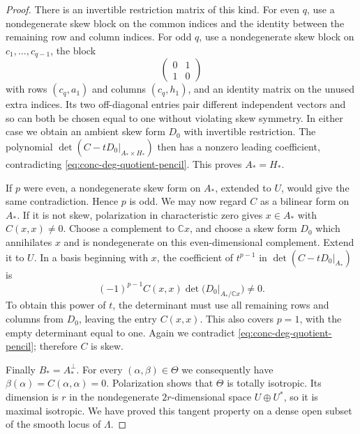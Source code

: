 \begin{proof}
There is an invertible restriction matrix of this kind.  For even $q$, use a nondegenerate skew block on the common indices and the identity between the remaining row and column indices.  For odd $q$, use a nondegenerate skew block on $c_1,\ldots,c_{q-1}$, the block
\[
 \begin{pmatrix}0&1\\1&0\end{pmatrix}
\]
with rows $(c_q,a_1)$ and columns $(c_q,h_1)$, and an identity matrix on the unused extra indices.  Its two off-diagonal entries pair different independent vectors and so can both be chosen equal to one without violating skew symmetry.  In either case we obtain an ambient skew form $D_0$ with invertible restriction.  The polynomial $\det(C-tD_0|_{A_*\times H_*})$ then has a nonzero leading coefficient, contradicting \eqref{eq:conc-deg-quotient-pencil}. This proves $A_*=H_*$.

If $p$ were even, a nondegenerate skew form on $A_*$, extended to $U$, would give the same contradiction.  Hence $p$ is odd.  We may now regard $C$ as a bilinear form on $A_*$.  If it is not skew, polarization in characteristic zero gives $x\in A_*$ with $C(x,x)\ne0$. Choose a complement to $\mathbb{C}x$, and choose a skew form $D_0$ which annihilates $x$ and is nondegenerate on this even-dimensional complement.  Extend it to $U$. In a basis beginning with $x$, the coefficient of $t^{p-1}$ in $\det(C-tD_0|_{A_*})$ is
\[
 (-1)^{p-1}C(x,x)
    \det\bigl(D_0|_{A_*/\mathbb{C}x}\bigr)\ne0.
\]
To obtain this power of $t$, the determinant must use all remaining rows and columns from $D_0$, leaving the entry $C(x,x)$.  This also covers $p=1$, with the empty determinant equal to one.  Again we contradict \eqref{eq:conc-deg-quotient-pencil}; therefore $C$ is skew.

Finally $B_*=A_*^\perp$.  For every $(\alpha,\beta)\in\Theta$ we consequently have $\beta(\alpha)=C(\alpha,\alpha)=0$. Polarization shows that $\Theta$ is totally isotropic. Its dimension is $r$ in the nondegenerate $2r$-dimensional space $U\oplus U^*$, so it is maximal isotropic.  We have proved this tangent property on a dense open subset of the smooth locus of $\Lambda$.


\end{proof}
